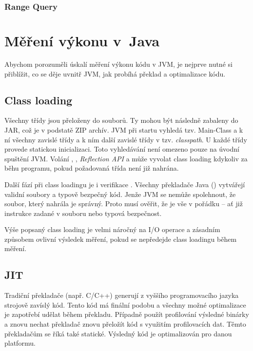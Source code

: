 \subsubsection{Range Query}

\section{Měření výkonu v~Java\label{sec:vykonvjava}}

Abychom porozuměli úskalí měření výkonu kódu v JVM, je nejprve nutné si přiblížit, co se děje uvnitř JVM, jak probíhá překlad a optimalizace kódu.

\subsection{Class loading}

Všechny třídy jsou přeloženy do \classfile{} souborů. Ty mohou být následně zabaleny do JAR, což je v podstatě ZIP archív. JVM při startu vyhledá tzv. Main-Class a k ní všechny zavislé třídy a k ním další zavislé třídy v tzv. \emph{classpath}. U každé třídy provede statickou inicializaci. Toto vyhledávání není omezeno pouze na úvodní spuštění JVM. Volání , , \emph{Reflection API} a  může vyvolat class loading kdykoliv za běhu programu, pokud požadovaná třída není již nahrána\cite{gosling2013java}\cite{lindholm2013java}.

Další fází při class loadingu je i verifikace \bytecode{}. Všechny překladače Java (\javac{}) vytvářejí validní \classfile{} soubory a typově bezpečný kód. Jenže JVM se nemůže spolehnout, že soubor, který nahrála je správný. Proto musí ověřit, že je vše v pořádku -- ať již instrukce zadané v \classfile{} souboru nebo typová bezpečnost.

Výše popsaný class loading je velmi náročný na I/O operace a zásadním způsobem ovlivní výsledek měření, pokud se nepředejde class loadingu během měření.

\subsection{JIT\label{sub:JIT}}
Tradiční překladače (např. C/C++) generují z vyššího programovacího jazyka strojově zavíslý kód. Tento kód má finální podobu a všechny možné optimalizace je zapotřebí udělat během překladu. Případně použít profilování výsledné binárky a znovu nechat překladač znovu přeložít kód s využitím profilovacích dat. Těmto překladačům se říká také statické. Výsledný kód je optimalizován pro danou platformu.


